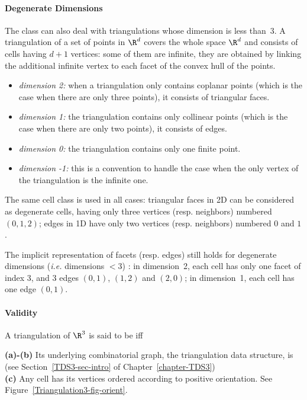 \paragraph{Degenerate Dimensions}
The class  can also deal with
triangulations whose dimension is less than~3. A triangulation of a
set of points in $\R^d$ covers the whole space $\R^d$ and consists of
cells having $d+1$ vertices: some of them are infinite, they are
obtained by linking the additional infinite vertex to each facet of
the convex hull of the points.
\begin{itemize}
\item {} \emph{dimension 2:} when a triangulation only contains
coplanar points (which is the case when there are only three points), 
it consists of triangular faces.
\item {} \emph{dimension 1:} the triangulation contains only collinear 
points (which is the case when there are only two points), it consists
of edges.
\item {} \emph{dimension 0:} the triangulation contains only one
finite point.
\item {} \emph{dimension -1:} this is a convention to handle the case
when the only vertex of the triangulation is the infinite one.
\end{itemize} 

The same cell class is used in all cases: triangular faces in
2D can be considered as degenerate cells, having only three vertices
(resp. neighbors) numbered $(0,1,2)$;
edges in 1D have only two vertices (resp. neighbors) numbered $0$ and $1$. 

The implicit representation of facets (resp. edges) still holds
for degenerate dimensions (\textit{i.e.} dimensions $<3$) : in
dimension~2, each cell has only one facet of index 3, and 3 edges
$(0,1)$, $(1,2)$ and $(2,0)$; in dimension~1, each cell has one edge
$(0,1)$.  

\paragraph{Validity}
A triangulation of $\R^3$ is said to be  iff

{\bf (a)-(b)} Its underlying combinatorial graph, the triangulation
data structure, is  
(see Section~\ref{TDS3-sec-intro} of Chapter~\ref{chapter-TDS3})\\
{\bf (c)} Any cell has its vertices ordered according to positive
orientation. See Figure~\ref{Triangulation3-fig-orient}.

